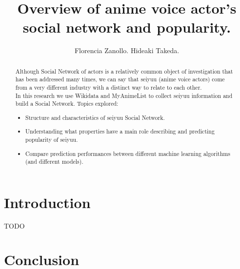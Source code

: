 \documentclass[a4paper]{report}
\begin{document}
	\title{Overview of anime voice actor's social network and popularity.}
	\author{Florencia Zanollo. Hideaki Takeda.}
	\maketitle
	\tableofcontents

\begin{abstract}
	Although Social Network of actors is a relatively common object of investigation that has been addressed many times, we can say that seiyuu (anime voice actors) come from a very different industry with a distinct way to relate to each other. \\
	In this research we use Wikidata and MyAnimeList to collect seiyuu information and build a Social Network. Topics explored:
	\begin{itemize}
	\item Structure and characteristics of seiyuu Social Network.
	\item Understanding what properties have a main role describing and predicting popularity of seiyuu.
	\item Compare prediction performances between different machine learning algorithms (and different models).
	\end{itemize}
\end{abstract}

\chapter{Introduction}
	TODO





\chapter{Conclusion}
	

\begin{thebibliography}{5}

\end{thebibliography}
\end{document}
